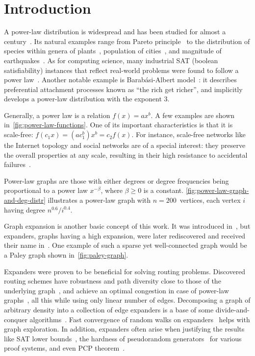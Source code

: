 \chapter{Introduction}
\label{ch:intro}

A power-law distribution is widespread and has been studied for almost a century~\cite{lot26}.
Its natural examples range from Pareto principle~\cite{par97}
to the distribution of species within genera of plants~\cite{yul25},
population of cities~\cite{zip49}, and magnitude of earthquakes~\cite{gr54}.
As for computing science, many industrial SAT (boolean satisfiability) instances
that reflect real-world problems were found to follow a power law~\cite{abl09practical}.
Another notable example is Barab\'asi-Albert model~\cite{ba99}:
it describes preferential attachment processes known as ``the rich get richer'',
and implicitly develops a power-law distribution with the exponent $3$.

Generally, a power law is a relation $f(x)=ax^b$.
A few examples are shown in~\autoref{fig:power-law-functions}.
One of its important characteristics is that it is scale-free: $f(c_1x)=(ac_1^b)x^b=c_2f(x)$.
For instance, scale-free networks like the Internet topology and social networks
are of a special interest: they preserve the overall properties at any scale,
resulting in their high resistance to accidental failures~\cite{bb03,fff99}.

Power-law graphs are those with either degrees or degree frequencies
being proportional to a power law $x^{-\beta}$, where $\beta\geq0$ is a constant.
\autoref{fig:power-law-graph-and-deg-distr} illustrates a power-law graph
with $n=200$~vertices, each vertex $i$ having degree $n^{0.6}/i^{0.4}$.

Graph expansion is another basic concept of this work.
It was introduced in~\cite{kb67},
but expanders, graphs having a high expansion,
were later rediscovered and received their name in~\cite{pin73}.
One example of such a sparse yet well-connected graph
would be a Paley graph shown in~\autoref{fig:paley-graph}.

Expanders were proven to be beneficial for solving routing problems.
Discovered routing schemes have robustness and path diversity
close to those of the underlying graph~\cite{fgrv14},
and achieve an optimal congestion in case of power-law graphs~\cite{gms03},
all this while using only linear number of edges.
Decomposing a graph of arbitrary density into a collection of edge expanders
is a base of some divide-and-conquer algorithms~\cite{ms17}.
Fast convergence of random walks on expanders~\cite{mih89} helps with graph exploration.
In addition, expanders often arise when justifying the results like
SAT lower bounds~\cite{ahi05,abbimp05,prst16},
the hardness of pseudorandom generators~\cite{abrw04} for various proof systems,
and even PCP theorem~\cite{din07}.

